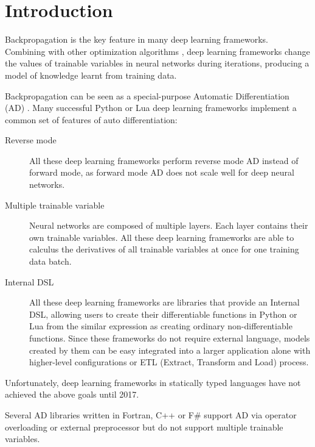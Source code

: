 \section{Introduction \label{introduction}}

Backpropagation \cite{rumelhart1985learning} is the key feature in many deep learning frameworks. Combining with other optimization algorithms \cite{kingma2014adam, zeiler2012adadelta,duchi2011adaptive}, deep learning frameworks change the values of trainable variables in neural networks during iterations, producing a model of knowledge learnt from training data.

Backpropagation can be seen as a special-purpose Automatic Differentiation (AD) \cite{baydin2015automatic}. Many successful Python or Lua deep learning frameworks \cite{collobert2008torch,bergstra2010theano,tokui2015chainer,google2017eager,paszke2017pytorch} implement a common set of features of auto differentiation:

\begin{description}

  \item[Reverse mode] All these deep learning frameworks perform reverse mode AD instead of forward mode, as forward mode AD does not scale well for deep neural networks.

  \item[Multiple trainable variable] Neural networks are composed of multiple layers. Each layer contains their own trainable variables. All these deep learning frameworks are able to calculus the derivatives of all trainable variables at once for one training data batch.

  \item[Internal DSL \cite{fowler2010domain}] All these deep learning frameworks are libraries that provide an Internal DSL, allowing users to create their differentiable functions in Python or Lua from the similar expression as creating ordinary non-differentiable functions. Since these frameworks do not require external language, models created by them can be easy integrated into a larger application alone with higher-level configurations \cite{chollet2015keras} or ETL (Extract, Transform and Load) process.

\end{description}

Unfortunately, deep learning frameworks in statically typed languages have not achieved the above goals until 2017.

Several AD libraries \cite{bischof1992adifor,griewank1996algorithm,TapenadeRef13,baydin2015diffsharp} written in Fortran, C++ or F\# support AD via operator overloading or external preprocessor but do not support multiple trainable variables.

